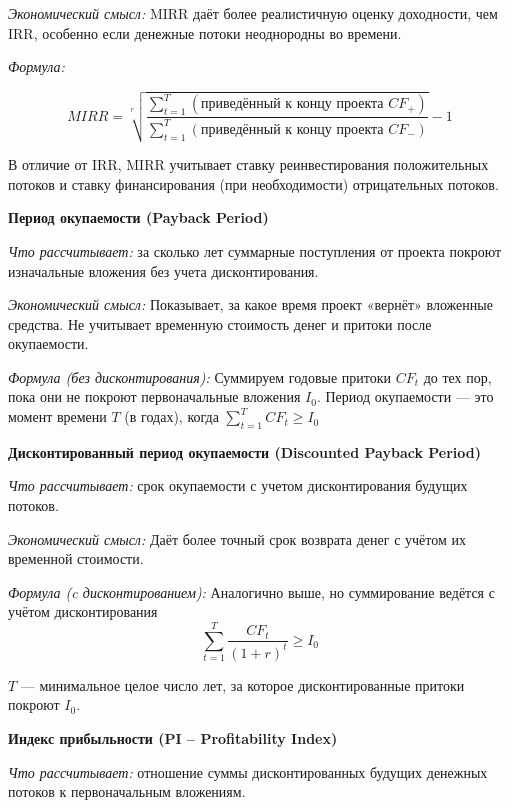 \textit{Экономический смысл:} MIRR даёт более реалистичную оценку доходности, чем IRR, особенно если денежные потоки неоднородны во времени.

\textit{Формула:}

\begin{equation}
    MIRR = \sqrt[r]{\frac{\sum \limits ^T _{t=1} \left( \text{приведённый к концу проекта }CF_+ \right)}{\sum \limits ^T _{t=1} \left( \text{приведённый к концу проекта }CF_- \right)}} - 1
\end{equation}

В отличие от IRR, MIRR учитывает ставку реинвестирования положительных потоков и ставку финансирования (при необходимости) отрицательных потоков.


\textbf{Период окупаемости (Payback Period)}

\textit{Что рассчитывает:} за сколько лет суммарные поступления от проекта покроют изначальные вложения без учета дисконтирования.

\textit{Экономический смысл:} Показывает, за какое время проект «вернёт» вложенные средства. Не учитывает временную стоимость денег и притоки после окупаемости.

\textit{Формула (без дисконтирования):}
Суммируем годовые притоки $CF_t$ до тех пор, пока они не покроют первоначальные вложения $I_0$.
Период окупаемости --- это момент времени $T$ (в годах), когда $\sum \limits ^T _{t=1} CF_t \geq I_0$

\textbf{Дисконтированный период окупаемости (Discounted Payback Period)}

\textit{Что рассчитывает:} срок окупаемости с учетом дисконтирования будущих потоков.

\textit{Экономический смысл:} Даёт более точный срок возврата денег с учётом их временной стоимости.

\textit{Формула (c дисконтированием):}
Аналогично выше, но суммирование ведётся с учётом дисконтирования
\begin{equation}
    \sum \limits_{t=1} ^T \frac{CF_t}{(1+r)^t} \geq I_0
\end{equation}

$T$ --- минимальное целое число лет, за которое дисконтированные притоки покроют $I_0$.



\textbf{Индекс прибыльности (PI – Profitability Index)}

\textit{Что рассчитывает:} отношение суммы дисконтированных будущих денежных потоков к первоначальным вложениям.

